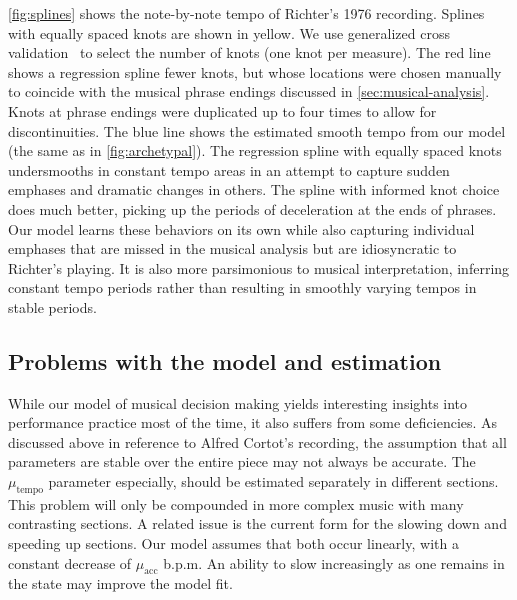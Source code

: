 \documentclass[aoas]{imsart}
\begin{document}
\autoref{fig:splines}
shows the note-by-note tempo of Richter's 1976 recording. Splines with
equally spaced knots are shown in yellow. We use generalized cross
validation~\citep{GolubHeath1979} to select the number of knots (one
knot per measure). The red line shows a regression spline fewer knots,
but whose locations were chosen
manually
to coincide with the musical phrase endings discussed in
\autoref{sec:musical-analysis}. Knots at phrase endings were
duplicated up to four times to allow for discontinuities. The blue line 
shows the estimated smooth tempo from our model (the same as in
\autoref{fig:archetypal}). The regression spline with
equally spaced knots undersmooths in constant tempo areas in an
attempt to capture sudden emphases and dramatic changes in others. The spline
with informed knot choice does much better, picking up the periods of
deceleration at the ends of phrases. Our model learns these behaviors
on its own while also capturing individual emphases that are missed in
the musical analysis but are idiosyncratic to Richter's playing. It is
also more parsimonious to musical interpretation, inferring constant
tempo periods rather than resulting in smoothly varying tempos in
stable periods.%

\subsection{Problems with the model and estimation}
\label{sec:problems-with-model}

While our model of musical decision making yields interesting insights
into performance practice most of the time, it also suffers from some
deficiencies. As discussed above in reference to Alfred Cortot's
recording, the assumption that all parameters are stable over the
entire piece may not always be accurate. The $\mu_{\textrm{tempo}}$
parameter especially, should be estimated separately in different
sections. This problem will only be compounded in more complex music
with many contrasting sections. A related issue is the current form
for the slowing down and speeding up sections. Our model assumes that
both occur linearly, with a constant decrease of $\mu_{\textrm{acc}}$
b.p.m. An ability to slow increasingly as one remains in the state may
improve the model fit.
\end{document}
